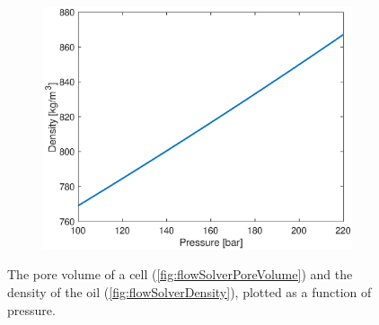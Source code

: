 \begin{figure}[H]
\begin{subfigure}[t]{0.48\textwidth}
    \end{subfigure}
    \begin{subfigure}[t]{0.48\textwidth}
        \includegraphics[width=\textwidth]{figures/flow_solver_density.eps}
        \caption{}
        \label{fig:flowSolverDensity}
    \end{subfigure}
    \caption{The pore volume of a cell (\autoref{fig:flowSolverPoreVolume}) and the density of the oil (\autoref{fig:flowSolverDensity}), plotted as a function of pressure.}
\end{figure}

